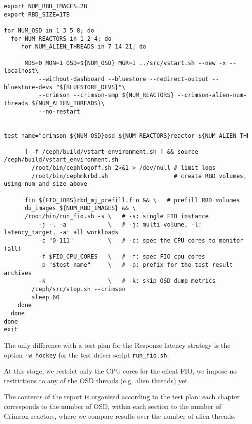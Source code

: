 \begin{verbatim}
export NUM_RBD_IMAGES=28
export RBD_SIZE=1TB

for NUM_OSD in 1 3 5 8; do
  for NUM_REACTORS in 1 2 4; do
     for NUM_ALIEN_THREADS in 7 14 21; do 

      MDS=0 MON=1 OSD=${NUM_OSD} MGR=1 ../src/vstart.sh --new -x --localhost\
          --without-dashboard --bluestore --redirect-output --bluestore-devs "${BLUESTORE_DEVS}"\
          --crimson --crimson-smp ${NUM_REACTORS} --crimson-alien-num-threads ${NUM_ALIEN_THREADS}\
          --no-restart

      test_name="crimson_${NUM_OSD}osd_${NUM_REACTORS}reactor_${NUM_ALIEN_THREADS}at_8fio_1tb_lt"
	
      [ -f /ceph/build/vstart_environment.sh ] && source /ceph/build/vstart_environment.sh
	    /root/bin/cephlogoff.sh 2>&1 > /dev/null # limit logs
	    /root/bin/cephmkrbd.sh                   # create RBD volumes, using num and size above

      fio ${FIO_JOBS}rbd_mj_prefill.fio && \   # prefill RBD volumes
      du_images ${NUM_RBD_IMAGES} && \
      /root/bin/run_fio.sh -s \   # -s: single FIO instance
          -j -l -a            \   # -j: multi volume, -l: latency_target, -a: all workloads
          -c "0-111"          \   # -c: spec the CPU cores to monitor (all)
          -f $FIO_CPU_CORES   \   # -f: spec FIO cpu cores
          -p "$test_name"     \   # -p: prefix for the test result archives
          -k                  \   # -k: skip OSD dump_metrics
	    /ceph/src/stop.sh --crimson
	    sleep 60
    done
  done
done
exit
\end{verbatim}

The only difference with a test plan for the Response latency strategy is the option {\tt -w hockey}
for the test driver script {\tt run\_fio.sh}.

At this stage, we restrict only the CPU cores for the client FIO, 
we impose no restrictions to any of the OSD threads (e.g. alien threads) yet.

The contents of the report is organised according to the test plan: each chapter
corresponds to the number of OSD, within each section to the number of Crimson 
reactors, where we compare results over the number of alien threads.
